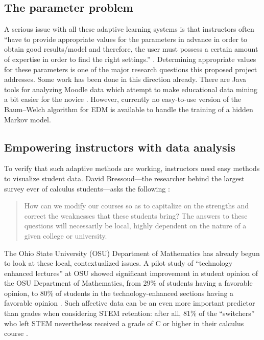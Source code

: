 \documentclass[12pt]{article}
\begin{document}
\subsection{The parameter problem}

A serious issue with all these adaptive learning systems is that
instructors often ``have to provide appropriate values for the
parameters in advance in order to obtain good results/model and
therefore, the user must possess a certain amount of expertise in
order to find the right settings.'' \parencite{romero2010educational}.
Determining appropriate values for these parameters is one of the
major research questions this proposed project addresses.  Some work
has been done in this direction already. There are Java tools for
analyzing Moodle data which attempt to make educational data mining a
bit easier for the novice \parencite{java-data-mining}. However,
currently no easy-to-use version of the Baum--Welch algorithm for EDM
is available to handle the training of a hidden Markov model.

\subsection{Empowering instructors with data analysis}

To verify that such adaptive methods are working, instructors need
easy methods to visualize student data.  David Bressoud---the
researcher behind the largest survey ever of calculus students---asks
the following \parencite{bressoud-sky-falling}:
\begin{quote}
  How can we modify our courses so as to capitalize on the strengths
  and correct the weaknesses that these students bring?  The answers
  to these questions will necessarily be local, highly dependent on
  the nature of a given college or university.
\end{quote}
The Ohio State University (OSU) Department of Mathematics has already
begun to look at these local, contextualized issues.  A pilot study of
``technology enhanced lectures'' at OSU showed significant improvement
in student opinion of the OSU Department of Mathematics, from 29\% of
students having a favorable opinion, to 80\% of students in the
technology-enhanced sections having a favorable opinion
\cite{miller-tech-enhanced-calculus}.  Such affective data can be an
even more important predictor than grades when considering STEM
retention: after all, 81\% of the ``switchers'' who left STEM
nevertheless received a grade of C or higher in their calculus course
\cite{calculus-programs}.
\end{document}
